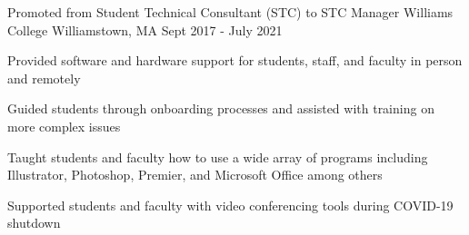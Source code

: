\begin{cventries}
  \cventry
  {Promoted from Student Technical Consultant (STC) to STC Manager}
  {Williams College}
  {Williamstown, MA}
  {Sept 2017 - July 2021}
  {
    \begin{cvitems}
      \item {Provided software and hardware support for students, staff, and faculty in person and remotely}
      \item {Guided students through onboarding processes and assisted with training on more complex issues}
      \item {Taught students and faculty how to use a wide array of programs including Illustrator, Photoshop, Premier, and Microsoft Office among others}
      \item {Supported students and faculty with video conferencing tools during COVID-19 shutdown}
    \end{cvitems}
  }
\end{cventries}
